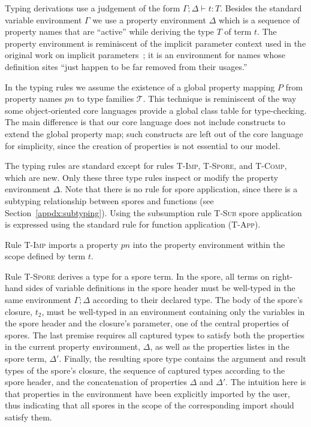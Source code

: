 Typing derivations use a judgement of the form $\Gamma ; \Delta \vdash t : T$.
Besides the standard variable environment $\Gamma$ we use a property environment
$\Delta$ which is a sequence of property names that are ``active'' while
deriving the type $T$ of term $t$. The property environment is reminiscent of
the implicit parameter context used in the original work on implicit
parameters~\cite{LewisLMS00}; it is an environment for names whose definition
sites ``just happen to be far removed from their usages.''

In the typing rules we assume the existence of a global property mapping $P$
from property names $pn$ to type families $\mathcal{T}$. This technique is
reminiscent of the way some object-oriented core languages provide a global
class table for type-checking. The main difference is that our core language
does not include constructs to extend the global property map; such constructs
are left out of the core language for simplicity, since the creation of
properties is not essential to our model.

The typing rules are standard except for rules \textsc{T-Imp}, \textsc{T-Spore},
and \textsc{T-Comp}, which are new. Only these three type rules inspect or
modify the property environment $\Delta$. Note that there is no rule for spore
application, since there is a subtyping relationship between spores and
functions (see Section~\ref{appdx:subtyping}). Using the subsumption rule
\textsc{T-Sub} spore application is expressed using the standard rule for
function application (\textsc{T-App}).

Rule \textsc{T-Imp} imports a property $pn$ into the property environment within
the scope defined by term $t$.

Rule \textsc{T-Spore} derives a type for a spore term. In the spore, all terms
on right-hand sides of variable definitions in the spore header must be
well-typed in the same environment $\Gamma ; \Delta$ according to their declared
type. The body of the spore's closure, $t_2$, must be well-typed in an
environment containing only the variables in the spore header and the closure's
parameter, one of the central properties of spores. The last premise requires
all captured types to satisfy both the properties in the current property
environment, $\Delta$, as well as the properties listes in the spore term,
$\Delta'$. Finally, the resulting spore type contains the argument and result
types of the spore's closure, the sequence of captured types according to the
spore header, and the concatenation of properties $\Delta$ and $\Delta'$. The
intuition here is that properties in the environment have been explicitly
imported by the user, thus indicating that all spores in the scope of the
corresponding import should satisfy them.

